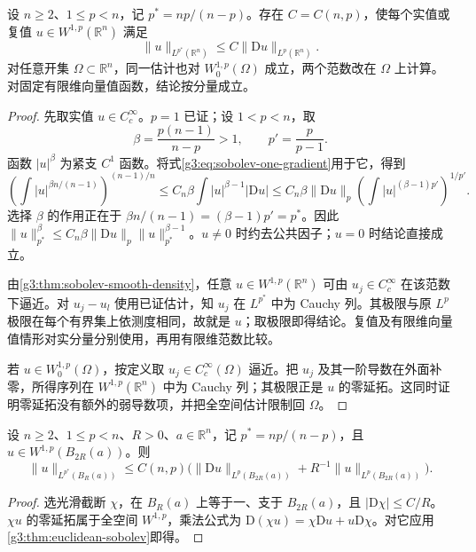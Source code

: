 \begin{theorem}\label{g3:thm:euclidean-sobolev}
	设 \(n\ge2\)、\(1\le p<n\)，记 \(p^*=np/(n-p)\)。存在 \(C=C(n,p)\)，使每个实值或复值 \(u\in W^{1,p}(\mathbb R^n)\) 满足
	\begin{equation}\label{g3:eq:euclidean-sobolev}
		\|u\|_{L^{p^*}(\mathbb R^n)}\le C\|\mathrm Du\|_{L^p(\mathbb R^n)}.
	\end{equation}
	对任意开集 \(\Omega\subset\mathbb R^n\)，同一估计也对 \(W_0^{1,p}(\Omega)\) 成立，两个范数改在 \(\Omega\) 上计算。对固定有限维向量值函数，结论按分量成立。
\end{theorem}
\begin{proof}
	先取实值 \(u\in C_c^\infty\)。\(p=1\) 已证；设 \(1<p<n\)，取
	\[
		\beta=\frac{p(n-1)}{n-p}>1,\qquad p'=\frac p{p-1}.
	\]
	函数 \(|u|^\beta\) 为紧支 \(C^1\) 函数。将式\eqref{g3:eq:sobolev-one-gradient}用于它，得到
	\[
		\left(\int|u|^{\beta n/(n-1)}\right)^{(n-1)/n}
		\le C_n\beta\int |u|^{\beta-1}|\mathrm Du|
		\le C_n\beta\|\mathrm Du\|_p
		\left(\int|u|^{(\beta-1)p'}\right)^{1/p'}.
	\]
	选择 \(\beta\) 的作用正在于
	\(\beta n/(n-1)=(\beta-1)p'=p^*\)。因此
	\(\|u\|_{p^*}^{\beta}\le C_n\beta\|\mathrm Du\|_p\|u\|_{p^*}^{\beta-1}\)。\(u\ne0\) 时约去公共因子；\(u=0\) 时结论直接成立。

	由\cref{g3:thm:sobolev-smooth-density}，任意 \(u\in W^{1,p}(\mathbb R^n)\) 可由 \(u_j\in C_c^\infty\) 在该范数下逼近。对 \(u_j-u_l\) 使用已证估计，知 \(u_j\) 在 \(L^{p^*}\) 中为 Cauchy 列。其极限与原 \(L^p\) 极限在每个有界集上依测度相同，故就是 \(u\)；取极限即得结论。复值及有限维向量值情形对实分量分别使用，再用有限维范数比较。

	若 \(u\in W_0^{1,p}(\Omega)\)，按定义取 \(u_j\in C_c^\infty(\Omega)\) 逼近。把 \(u_j\) 及其一阶导数在外面补零，所得序列在 \(W^{1,p}(\mathbb R^n)\) 中为 Cauchy 列；其极限正是 \(u\) 的零延拓。这同时证明零延拓没有额外的弱导数项，并把全空间估计限制回 \(\Omega\)。
\end{proof}

\begin{corollary}\label{g3:cor:local-sobolev}
	设 \(n\ge2\)、\(1\le p<n\)、\(R>0\)、\(a\in\mathbb R^n\)，记 \(p^*=np/(n-p)\)，且 \(u\in W^{1,p}(B_{2R}(a))\)。则
	\[
		\|u\|_{L^{p^*}(B_R(a))}
		\le C(n,p)\bigl(\|\mathrm Du\|_{L^p(B_{2R}(a))}+R^{-1}\|u\|_{L^p(B_{2R}(a))}\bigr).
	\]
\end{corollary}
\begin{proof}
	选光滑截断 \(\chi\)，在 \(B_R(a)\) 上等于一、支于 \(B_{2R}(a)\)，且 \(|\mathrm D\chi|\le C/R\)。\(\chi u\) 的零延拓属于全空间 \(W^{1,p}\)，乘法公式为 \(\mathrm D(\chi u)=\chi \mathrm Du+u\mathrm D\chi\)。对它应用\cref{g3:thm:euclidean-sobolev}即得。
\end{proof}

